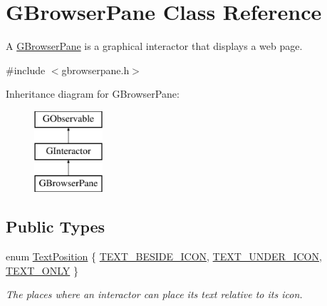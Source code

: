 \hypertarget{classGBrowserPane}{}\section{G\+Browser\+Pane Class Reference}
\label{classGBrowserPane}


A \mbox{\hyperlink{classGBrowserPane}{G\+Browser\+Pane}} is a graphical interactor that displays a web page.  




{\ttfamily \#include $<$gbrowserpane.\+h$>$}

Inheritance diagram for G\+Browser\+Pane\+:\begin{figure}[H]
\begin{center}
\leavevmode
\includegraphics[height=3.000000cm]{classGBrowserPane}
\end{center}
\end{figure}
\subsection*{Public Types}
\begin{DoxyCompactItemize}
\item 
enum \mbox{\hyperlink{classGInteractor_a8e0d441725a81d2bbdebbea09078260e}{Text\+Position}} \{ \mbox{\hyperlink{classGInteractor_a8e0d441725a81d2bbdebbea09078260ea4cd6f2e7d5a08d6f4dc052df2358f774}{T\+E\+X\+T\+\_\+\+B\+E\+S\+I\+D\+E\+\_\+\+I\+C\+ON}}, 
\mbox{\hyperlink{classGInteractor_a8e0d441725a81d2bbdebbea09078260eaa88490f63d8de68d44c83bdb2ecde3b3}{T\+E\+X\+T\+\_\+\+U\+N\+D\+E\+R\+\_\+\+I\+C\+ON}}, 
\mbox{\hyperlink{classGInteractor_a8e0d441725a81d2bbdebbea09078260ea39a6f388a30ac4fefb6eb13e846bc9f2}{T\+E\+X\+T\+\_\+\+O\+N\+LY}}
 \}
\begin{DoxyCompactList}\small\item\em The places where an interactor can place its text relative to its icon. \end{DoxyCompactList}\end{DoxyCompactItemize}
